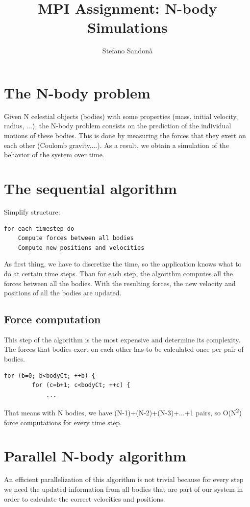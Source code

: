 \documentclass[a4paper]{article}
\begin{document}
\title{MPI Assignment: N-body Simulations}
\author{Stefano Sandonà}
\date{}
		
\maketitle

\section{The N-body problem}
\label{sec:nbody_problem}
Given N celestial objects (bodies) with some properties (mass, initial velocity, radius, ...), the N-body problem consists on the  prediction of the individual motions of these bodies. This is done by measuring the forces that they exert on each other (Coulomb gravity,...). As a result, we obtain a simulation of the behavior of the system over time.  

\section{The sequential algorithm}
\label{sec:seq_algo}
Simplify structure:
\begin{lstlisting}
for each timestep do
	Compute forces between all bodies
	Compute new positions and velocities
\end{lstlisting}

As first thing, we have to discretize the time, so the application knows what to do at certain time steps. Than for each step, the algorithm computes all the forces between all the bodies. With the resulting forces, the new velocity and positions of all the bodies are updated.

\subsection{Force computation}
\label{sec:force_comp_seq}
This step of the algorithm is the most expensive and determine its complexity.
The forces that bodies exert on each other has to be calculated once per pair of bodies.
\begin{lstlisting}
for (b=0; b<bodyCt; ++b) {
		for (c=b+1; c<bodyCt; ++c) {
			...
\end{lstlisting}
That means with N bodies, we have (N-1)+(N-2)+(N-3)+...+1 pairs, so O(N\textsuperscript{2}) force computations for every time step.

\section{Parallel N-body algorithm}
\label{sec:par}
An efficient parallelization of this algorithm is not trivial because for every step we need the updated information from all bodies that are part of our system in order to calculate the correct velocities and positions. 
\end{document}
